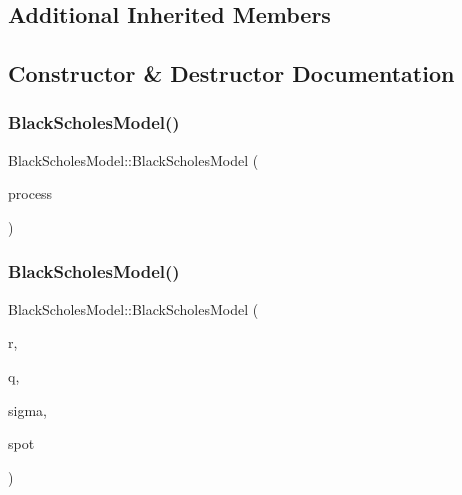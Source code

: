 \subsection*{Additional Inherited Members}


\subsection{Constructor \& Destructor Documentation}
\hypertarget{class_black_scholes_model_a5cc9ce0cdb0f040da65677b2c07f09b5}{}\label{class_black_scholes_model_a5cc9ce0cdb0f040da65677b2c07f09b5} 
\subsubsection{\texorpdfstring{Black\+Scholes\+Model()}{BlackScholesModel()}\hspace{0.1cm}{\footnotesize\ttfamily [1/2]}}
{\footnotesize\ttfamily Black\+Scholes\+Model\+::\+Black\+Scholes\+Model (\begin{DoxyParamCaption}\item[{std\+::shared\+\_\+ptr$<$ \hyperlink{class_b_s_stochastic_process}{B\+S\+Stochastic\+Process} $>$}]{process }\end{DoxyParamCaption})}

\hypertarget{class_black_scholes_model_a59aa736bd849bc59fed035f702e9813b}{}\label{class_black_scholes_model_a59aa736bd849bc59fed035f702e9813b} 
\subsubsection{\texorpdfstring{Black\+Scholes\+Model()}{BlackScholesModel()}\hspace{0.1cm}{\footnotesize\ttfamily [2/2]}}
{\footnotesize\ttfamily Black\+Scholes\+Model\+::\+Black\+Scholes\+Model (\begin{DoxyParamCaption}\item[{double}]{r,  }\item[{double}]{q,  }\item[{double}]{sigma,  }\item[{double}]{spot }\end{DoxyParamCaption})}



